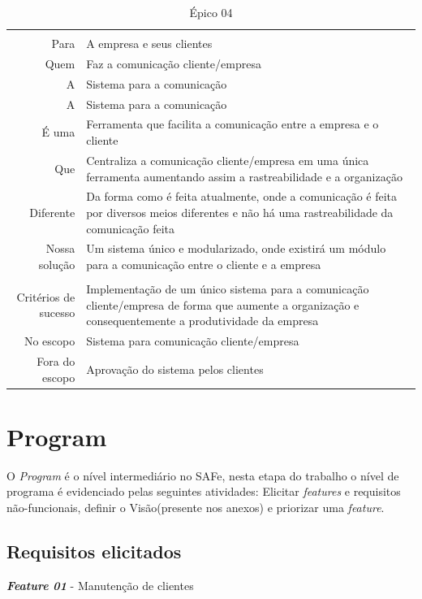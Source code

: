 \begin{table}[]
\centering
\label{label-epico04}
\begin{tabular}{
>{\columncolor[HTML]{96FFFB}}r l}
\multicolumn{2}{c}{\cellcolor[HTML]{34CDF9}Centralização da comunicação}  \\
Para                 & A empresa e seus clientes\\
Quem                 & Faz a comunicação cliente/empresa     \\
A                    & Sistema para a comunicação            \\
A                    & Sistema para a comunicação            \\
É uma                & Ferramenta que facilita a comunicação entre a empresa e o cliente            \\
Que                  & Centraliza a comunicação cliente/empresa em uma única ferramenta aumentando assim a rastreabilidade e a organização \\
Diferente            & Da forma como é feita atualmente, onde a comunicação é feita por diversos meios diferentes e não há uma rastreabilidade da comunicação feita  \\
Nossa solução        & Um sistema único e modularizado, onde existirá um módulo para a comunicação entre o cliente e a empresa\\
\multicolumn{2}{c}{\cellcolor[HTML]{34CDF9}Escopo}           \\
Critérios de sucesso & Implementação de um único sistema para a comunicação cliente/empresa de forma que aumente a organização e consequentemente a produtividade da empresa \\
No escopo            & Sistema para comunicação cliente/empresa                        \\
Fora do escopo       & Aprovação do sistema pelos clientes  
\end{tabular}
\caption{Épico 04}
\end{table}
\section{Program}
O \textit{Program} é o nível intermediário no SAFe, nesta etapa do trabalho o nível de programa é evidenciado pelas seguintes atividades: Elicitar \textit{features} e requisitos não-funcionais, definir o Visão(presente nos anexos) e priorizar uma \textit{feature}.
\subsection{Requisitos elicitados}
\textbf{\textit{Feature 01}} - Manutenção de clientes

